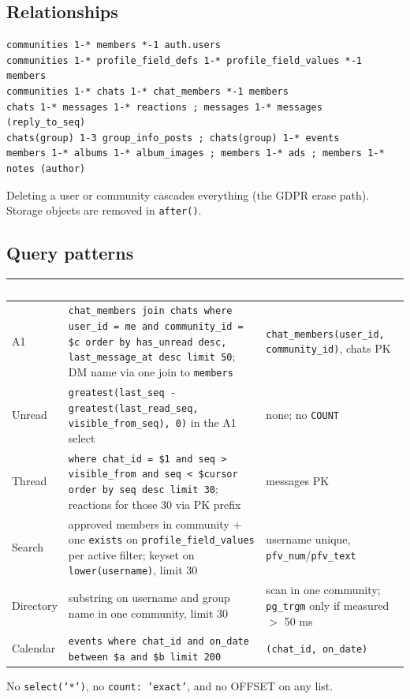 \documentclass[11pt,a4paper]{article}
\newcommand{\hdr}[1]{\textcolor{white}{\textbf{#1}}}
\newcommand{\code}[1]{\texttt{\small #1}}
\begin{document}
\subsection{Relationships}
{\small
\begin{verbatim}
communities 1-* members *-1 auth.users
communities 1-* profile_field_defs 1-* profile_field_values *-1 members
communities 1-* chats 1-* chat_members *-1 members
chats 1-* messages 1-* reactions ; messages 1-* messages (reply_to_seq)
chats(group) 1-3 group_info_posts ; chats(group) 1-* events
members 1-* albums 1-* album_images ; members 1-* ads ; members 1-* notes (author)
\end{verbatim}
}
Deleting a user or community cascades everything (the GDPR erase path). Storage objects are removed in
\code{after()}.

\subsection{Query patterns}
{\small
{}
\begin{longtable}{L{2cm} L{9.4cm} L{3.4cm}}
\hdr{Pattern} & \hdr{SQL shape} & \hdr{Index}\\
\endhead
A1 & \code{chat\_members join chats where user\_id = me and community\_id = \$c order by has\_unread desc, last\_message\_at desc limit 50}; DM name via one join to \code{members} & \code{chat\_members(user\_id, community\_id)}, chats PK\\
Unread & \code{greatest(last\_seq - greatest(last\_read\_seq, visible\_from\_seq), 0)} in the A1 select & none; no \code{COUNT}\\
Thread & \code{where chat\_id = \$1 and seq > visible\_from and seq < \$cursor order by seq desc limit 30}; reactions for those 30 via PK prefix & messages PK\\
Search & approved members in community + one \code{exists} on \code{profile\_field\_values} per active filter; keyset on \code{lower(username)}, limit 30 & username unique, \code{pfv\_num}/\code{pfv\_text}\\
Directory & substring on username and group name in one community, limit 30 & scan in one community; \code{pg\_trgm} only if measured $>$ 50 ms\\
Calendar & \code{events where chat\_id and on\_date between \$a and \$b limit 200} & \code{(chat\_id, on\_date)}\\
\end{longtable}
}
No \code{select('*')}, no \code{count: 'exact'}, and no OFFSET on any list.
\end{document}
